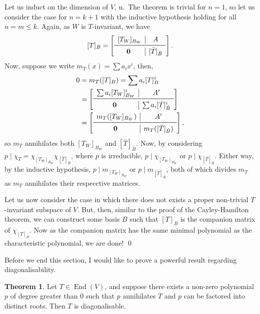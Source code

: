 \documentclass[
]{article}
\theoremstyle{definition}
\newtheorem{theorem}{Theorem}
\theoremstyle{definition}
\begin{document}
Let us induct on the dimension of \(V\), n.~The theorem is trivial for
\(n = 1\), so let us consider the case for \(n = k + 1\) with the
inductive hypothesis holding for all \(n = m \le k\). Again, as \(W\) is
\(T\)-invariant, we have \[[T]_B = 
    \left[
      \begin{array}{c|c}
        [T_W]_{B_W} & A \\
        \midrule
        \mathbf{0} & [\bar{T}]_{\bar{B}}
      \end{array}
      \right]. \] Now, suppose we write \(m_T(x) = \sum a_i x^i\), then,
\begin{align*}
    0 & = m_T([T]_B) = \sum a_i [T]_B^i \\
      & = \left[
          \begin{array}{c|c}
            \sum a_i [T_W]_{B_W}^i & A' \\
            \midrule
            \mathbf{0} & \sum a_i [\bar{T}]_{\bar{B}}^i
          \end{array}
          \right] \\
      & = \left[
          \begin{array}{c|c}
            m_T([T_W]_{B_W}) & A' \\
            \midrule
            \mathbf{0} & m_T([\bar{T}]_{\bar{B}})
          \end{array}
          \right],
  \end{align*} so \(m_T\) annihilates both \([T_W]_{B_W}\) and
\([\bar{T}]_{\bar{B}}\). Now, by considering
\(p \mid \chi_T = \chi_{[T_W]_{B_W}} \chi_{[\bar{T}]_{\bar{B}}}\), where
\(p\) is irreducible, \(p \mid \chi_{[T_W]_{B_W}}\) or
\(p \mid \chi_{[\bar{T}]_{\bar{B}}}\). Either way, by the inductive
hypothesis, \(p \mid m_{[T_W]_{B_W}}\) or
\(p \mid m_{[\bar{T}]_{\bar{B}}}\), both of which divides \(m_T\) as
\(m_T\) annihilates their respecctive matrices.

Let us now consider the case in which there does not exists a proper
non-trivial \(T\)-invariant subspace of \(V\). But, then, similar to the
proof of the Cayley-Hamilton theorem, we can construct some basis \(B\)
such that \([T]_B\) is the companion matrix of \(\chi_{[T]_B}\). Now as
the companion matrix has the same minimal polynomial as the
characteristic polynomial, we are done! \qed

Before we end this section, I would like to prove a powerful result
regarding diagonalisability.

\begin{theorem}\label{diag_distinct}
  Let \(T \in \mathop{\mathrm{End}}(V)\), and suppose there exists a non-zero polynomial \(p\) of 
  degree greater than 0 such that \(p\) annihilates \(T\) and \(p\) can be 
  factored into distinct roots. Then \(T\) is diagonalisable. 
\end{theorem}
\proof
\end{document}
